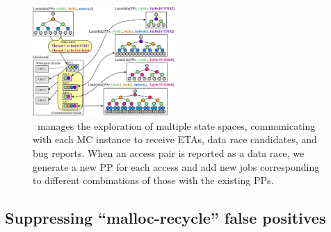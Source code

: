 \begin{figure}[t]
	\includegraphics[width=0.48\textwidth]{dr-jobs.pdf}
	\caption{\quicksand~manages the exploration of multiple state spaces, communicating with each MC instance to receive ETAs, data race candidates, and bug reports.
		When an access pair is reported as a data race, we generate a new PP for each access and add new jobs corresponding to different combinations of those with the existing PPs.}
	\label{fig:new-dr-jobs}
\end{figure}





\subsection{Suppressing ``malloc-recycle'' false positives}
\label{sec:recycle}


